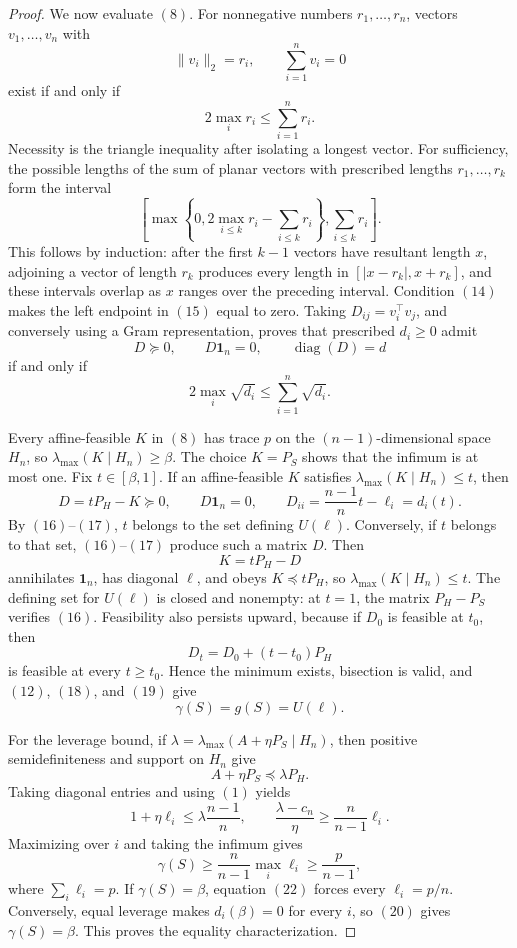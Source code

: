 \documentclass{article}
\begin{document}
\begin{proof}
We now evaluate \((8)\). For nonnegative numbers \(r_1,\ldots,r_n\), vectors \(v_1,\ldots,v_n\) with
\[
\|v_i\|_2=r_i,
\qquad
\sum_{i=1}^n v_i=0
\tag{13}
\]
exist if and only if
\[
2\max_i r_i\leq\sum_{i=1}^n r_i.
\tag{14}
\]
Necessity is the triangle inequality after isolating a longest vector. For sufficiency, the possible lengths of the sum of planar vectors with prescribed lengths \(r_1,\ldots,r_k\) form the interval
\[
\left[
\max\left\{0,2\max_{i\leq k}r_i-\sum_{i\leq k}r_i\right\},
\sum_{i\leq k}r_i
\right].
\tag{15}
\]
This follows by induction: after the first \(k-1\) vectors have resultant length \(x\), adjoining a vector of length \(r_k\) produces every length in \([|x-r_k|,x+r_k]\), and these intervals overlap as \(x\) ranges over the preceding interval. Condition \((14)\) makes the left endpoint in \((15)\) equal to zero. Taking \(D_{ij}=v_i^\top v_j\), and conversely using a Gram representation, proves that prescribed \(d_i\geq0\) admit
\[
D\succeq0,
\qquad
D\mathbf1_n=0,
\qquad
\operatorname{diag}(D)=d
\tag{16}
\]
if and only if
\[
2\max_i\sqrt{d_i}\leq\sum_{i=1}^n\sqrt{d_i}.
\tag{17}
\]

Every affine-feasible \(K\) in \((8)\) has trace \(p\) on the \((n-1)\)-dimensional space \(H_n\), so \(\lambda_{\max}(K\mid H_n)\geq\beta\). The choice \(K=P_S\) shows that the infimum is at most one. Fix \(t\in[\beta,1]\). If an affine-feasible \(K\) satisfies \(\lambda_{\max}(K\mid H_n)\leq t\), then
\[
D=tP_H-K\succeq0,
\qquad
D\mathbf1_n=0,
\qquad
D_{ii}=\frac{n-1}{n}t-\ell_i=d_i(t).
\tag{18}
\]
By \((16)\)--\((17)\), \(t\) belongs to the set defining \(U(\ell)\). Conversely, if \(t\) belongs to that set, \((16)\)--\((17)\) produce such a matrix \(D\). Then
\[
K=tP_H-D
\tag{19}
\]
annihilates \(\mathbf1_n\), has diagonal \(\ell\), and obeys \(K\preceq tP_H\), so \(\lambda_{\max}(K\mid H_n)\leq t\). The defining set for \(U(\ell)\) is closed and nonempty: at \(t=1\), the matrix \(P_H-P_S\) verifies \((16)\). Feasibility also persists upward, because if \(D_0\) is feasible at \(t_0\), then
\[
D_t=D_0+(t-t_0)P_H
\]
is feasible at every \(t\geq t_0\). Hence the minimum exists, bisection is valid, and \((12)\), \((18)\), and \((19)\) give
\[
\gamma(S)=g(S)=U(\ell).
\tag{20}
\]

For the leverage bound, if \(\lambda=\lambda_{\max}(A+\eta P_S\mid H_n)\), then positive semidefiniteness and support on \(H_n\) give
\[
A+\eta P_S\preceq\lambda P_H.
\]
Taking diagonal entries and using \((1)\) yields
\[
1+\eta\ell_i\leq\lambda\frac{n-1}{n},
\qquad
\frac{\lambda-c_n}{\eta}\geq\frac{n}{n-1}\ell_i.
\tag{21}
\]
Maximizing over \(i\) and taking the infimum gives
\[
\gamma(S)\geq\frac{n}{n-1}\max_i\ell_i
\geq\frac{p}{n-1},
\tag{22}
\]
where \(\sum_i\ell_i=p\). If \(\gamma(S)=\beta\), equation \((22)\) forces every \(\ell_i=p/n\). Conversely, equal leverage makes \(d_i(\beta)=0\) for every \(i\), so \((20)\) gives \(\gamma(S)=\beta\). This proves the equality characterization.


\end{proof}
\end{document}
